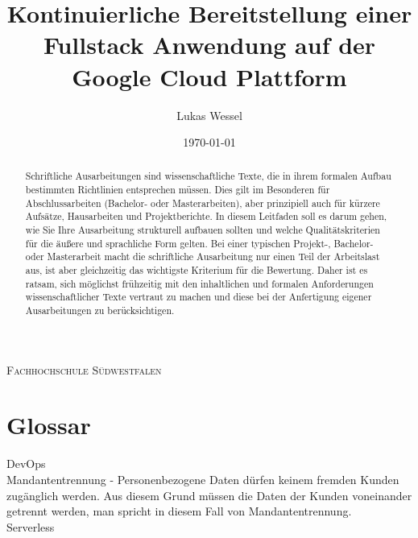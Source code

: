 \documentclass[pdftex,a4paper,abstracton,11pt,parskip=half,bibtotocnumbered]{scrartcl}
\title{Kontinuierliche Bereitstellung einer Fullstack Anwendung auf der Google Cloud Plattform}
\author{Lukas Wessel}
\date{\today}
\begin{document}
\makeatletter
\begin{titlepage}
	\centering
	{\scshape\LARGE Fachhochschule Südwestfalen \par}
	\vspace{1cm}
	\vspace{1.5cm}
	{\huge\bfseries \@title\par}
	\vspace{3cm}
	{\Large \@author\par}
	\vspace{1cm}
	{\Large \@date\par}
	\vfill

	\raggedright
\end{titlepage}
\makeatother

\thispagestyle{empty}
\begin{abstract}
Schriftliche Ausarbeitungen sind wissenschaftliche Texte, die in ihrem formalen Aufbau bestimmten Richtlinien entsprechen müssen.
Dies gilt im Besonderen für Abschlussarbeiten (Bachelor- oder Masterarbeiten), aber prinzipiell auch für kürzere Aufsätze, Hausarbeiten und Projektberichte.
In diesem Leitfaden soll es darum gehen, wie Sie Ihre Ausarbeitung strukturell aufbauen sollten und welche Qualitätskriterien für die äußere und sprachliche Form gelten.
Bei einer typischen Projekt-, Bachelor- oder Masterarbeit macht die schriftliche Ausarbeitung nur einen Teil der Arbeitslast aus, ist aber gleichzeitig das wichtigste Kriterium für die Bewertung.
Daher ist es ratsam, sich möglichst frühzeitig mit den inhaltlichen und formalen Anforderungen wissenschaftlicher Texte vertraut zu machen und diese bei der Anfertigung eigener Ausarbeitungen zu berücksichtigen.
\end{abstract}

\vfill
\tableofcontents
\pagebreak

\setcounter{page}{1}

\section{Glossar}
DevOps \\
Mandantentrennung - Personenbezogene Daten dürfen keinem fremden Kunden zugänglich werden. Aus diesem Grund müssen die Daten der Kunden voneinander getrennt werden, 
man spricht in diesem Fall von Mandantentrennung.\\
Serverless
\end{document}
